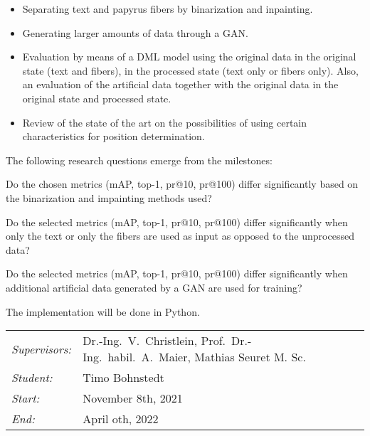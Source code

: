 \documentclass[12pt,a4paper]{article}
\begin{document}
\begin{itemize}
	\item Separating text and papyrus fibers by binarization and inpainting.
	
	\item Generating larger amounts of data through a GAN.
	
	\item  Evaluation by means of a DML model using the original data in the original state (text and fibers), in the processed state (text only or fibers only). Also, an evaluation of the artificial data together with the original data in the original state and processed state.
	
	\item Review of the state of the art on the possibilities of using certain characteristics for position determination.      	      	      
\end{itemize}
		
The following research questions emerge from the milestones:

\begin{questions}
	\item Do the chosen metrics (mAP, top-1, pr@10, pr@100) differ significantly based on the binarization and impainting methods used?
	
	\item  Do the selected metrics (mAP, top-1, pr@10, pr@100) differ significantly when only the text or only the fibers are used as input as opposed to the unprocessed data?  
	
	\item  Do the selected metrics (mAP, top-1, pr@10, pr@100) differ significantly when additional artificial data generated by a GAN are used for training?
\end{questions}

		
The implementation will be done in Python.\\
		
\begin{tabular}{ll}
	\emph{Supervisors:} & Dr.-Ing.~V.~Christlein,  Prof.~Dr.-Ing.~habil.~A.~Maier, Mathias Seuret M. Sc.
	\\
	\emph{Student:}     & Timo Bohnstedt
	\\
	\emph{Start:}       & November 8th, 2021                                            \\
	\emph{End:}         & April oth, 2022                                        \\
\end{tabular}
\nopagebreak[4]
\small

		
\end{document}

